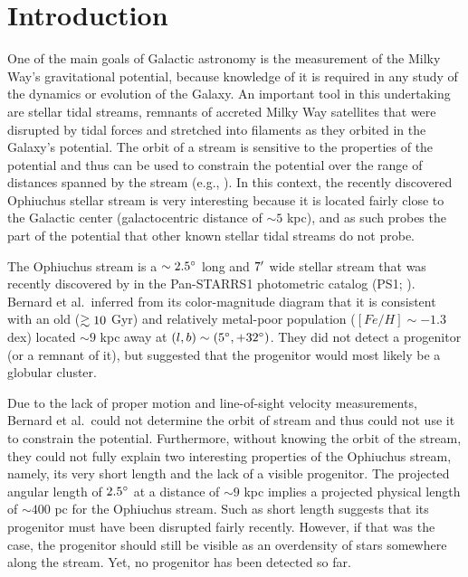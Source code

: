 \documentclass[iop]{emulateapj}
\begin{document}
\section{Introduction}\label{introduction}

One of the main goals of Galactic astronomy is the measurement of the Milky
Way's gravitational potential, because knowledge of it is required in any study
of the dynamics or evolution of the Galaxy. An important tool in this
undertaking are stellar tidal streams, remnants of accreted Milky Way satellites
that were disrupted by tidal forces and stretched into filaments as they orbited
in the Galaxy's potential. The orbit of a stream is sensitive to the properties
of the potential and thus can be used to constrain the potential over the range
of distances spanned by the stream (e.g., \citealt{kop10, new10, ses13, bel14}).
In this context, the recently discovered Ophiuchus stellar stream \citep{ber14b}
is very interesting because it is located fairly close to the Galactic center
(galactocentric distance of $\sim5$ kpc), and as such probes the part of the
potential that other known stellar tidal streams do not probe.

The Ophiuchus stream is a $\sim2.5\mbox{$^\circ$}$ long and $7\mbox{$^\prime$}$ wide stellar
stream that was recently discovered by \citet{ber14b} in the Pan-STARRS1
photometric catalog (PS1; \citealt{kai10}). Bernard et al.~inferred from its
color-magnitude diagram that it is consistent with an old ($\gtrsim10$ Gyr) and
relatively metal-poor population ($[Fe/H]\sim -1.3$ dex) located $\sim9$ kpc
away at $(l, b)\sim(5\mbox{$^\circ$}, +32\mbox{$^\circ$})$. They did not detect a progenitor (or
a remnant of it), but suggested that the progenitor would most likely be a
globular cluster.

Due to the lack of proper motion and line-of-sight velocity measurements,
Bernard et al.~could not determine the orbit of stream and thus could not use it
to constrain the potential. Furthermore, without knowing the orbit of the
stream, they could not fully explain two interesting properties of the
Ophiuchus stream, namely, its very short length and the lack of a visible
progenitor. The projected angular length of $2.5\mbox{$^\circ$}$ at a distance of
$\sim9$ kpc implies a projected physical length of $\sim400$ pc for the
Ophiuchus stream. Such as short length suggests that its progenitor must have
been disrupted fairly recently. However, if that was the case, the progenitor
should still be visible as an overdensity of stars somewhere along the stream.
Yet, no progenitor has been detected so far.
\end{document}
